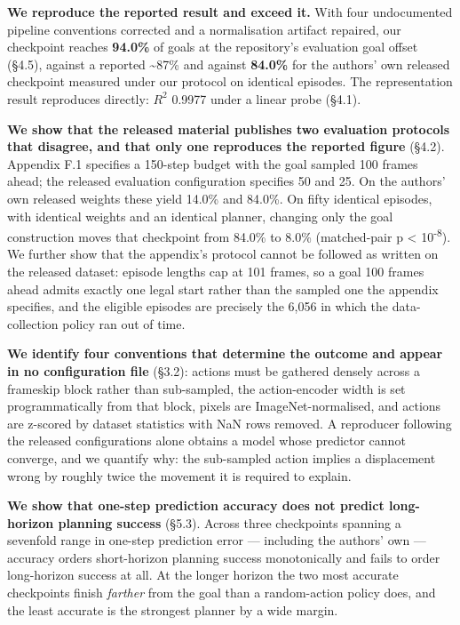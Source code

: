 \documentclass[10pt]{article}
\begin{document}
\textbf{We reproduce the reported result and exceed it.} With four undocumented
pipeline conventions corrected and a normalisation artifact repaired, our
checkpoint reaches \textbf{94.0\%} of goals at the repository's evaluation goal
offset (\S{}4.5), against a reported \textasciitilde87\% and against \textbf{84.0\%} for the authors'
own released checkpoint measured under our protocol on identical episodes. The
representation result reproduces directly: $R^{2}$ 0.9977 under a linear probe
(\S{}4.1).

\textbf{We show that the released material publishes two evaluation protocols that
disagree, and that only one reproduces the reported figure} (\S{}4.2). Appendix
F.1 specifies a 150-step budget with the goal sampled 100 frames ahead; the
released evaluation configuration specifies 50 and 25. On the authors' own
released weights these yield 14.0\% and 84.0\%. On fifty identical episodes, with
identical weights and an identical planner, changing only the goal construction
moves that checkpoint from 84.0\% to 8.0\% (matched-pair p \textless{} 10\textsuperscript{-8}). We further
show that the appendix's protocol cannot be followed as written on the released
dataset: episode lengths cap at 101 frames, so a goal 100 frames ahead admits
exactly one legal start rather than the sampled one the appendix specifies, and
the eligible episodes are precisely the 6,056 in which the data-collection
policy ran out of time.

\textbf{We identify four conventions that determine the outcome and appear in no
configuration file} (\S{}3.2): actions must be gathered densely across a frameskip
block rather than sub-sampled, the action-encoder width is set programmatically
from that block, pixels are ImageNet-normalised, and actions are z-scored by
dataset statistics with NaN rows removed. A reproducer following the released
configurations alone obtains a model whose predictor cannot converge, and we
quantify why: the sub-sampled action implies a displacement wrong by roughly
twice the movement it is required to explain.

\textbf{We show that one-step prediction accuracy does not predict long-horizon
planning success} (\S{}5.3). Across three checkpoints spanning a sevenfold range
in one-step prediction error --- including the authors' own --- accuracy orders
short-horizon planning success monotonically and fails to order long-horizon
success at all. At the longer horizon the two most accurate checkpoints finish
\emph{farther} from the goal than a random-action policy does, and the least accurate
is the strongest planner by a wide margin.
\end{document}
